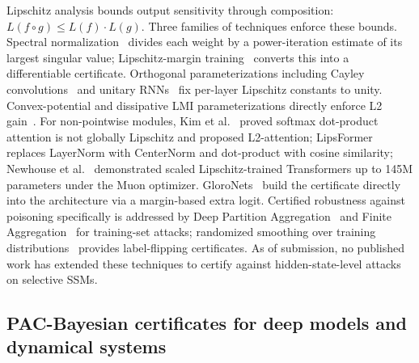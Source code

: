 \documentclass[journal,a4paper,10pt]{IEEEtran}
\theoremstyle{definition}
\theoremstyle{remark}
\begin{document}
Lipschitz analysis bounds output sensitivity through composition: $L(f \circ g) \leq L(f) \cdot L(g)$. Three families of techniques enforce these bounds. Spectral normalization~\cite{miyato2018spectral} divides each weight by a power-iteration estimate of its largest singular value; Lipschitz-margin training~\cite{tsuzuku2018margin} converts this into a differentiable certificate. Orthogonal parameterizations including Cayley convolutions~\cite{trockman2021cayley} and unitary RNNs~\cite{arjovsky2016unitary} fix per-layer Lipschitz constants to unity. Convex-potential and dissipative LMI parameterizations directly enforce L2 gain~\cite{pauli2024lipkernel,massai2025l2ru}. For non-pointwise modules, Kim et al.~\cite{kim2021lipschitz} proved softmax dot-product attention is not globally Lipschitz and proposed L2-attention; LipsFormer~\cite{qi2023lipsformer} replaces LayerNorm with CenterNorm and dot-product with cosine similarity; Newhouse et al.~\cite{newhouse2025lipschitz} demonstrated scaled Lipschitz-trained Transformers up to 145M parameters under the Muon optimizer. GloroNets~\cite{leino2021globally} build the certificate directly into the architecture via a margin-based extra logit. Certified robustness against poisoning specifically is addressed by Deep Partition Aggregation~\cite{levine2021deep} and Finite Aggregation~\cite{wang2022certified} for training-set attacks; randomized smoothing over training distributions~\cite{rosenfeld2020certified} provides label-flipping certificates. As of submission, no published work has extended these techniques to certify against hidden-state-level attacks on selective SSMs.

\subsection{PAC-Bayesian certificates for deep models and dynamical systems}
\end{document}
